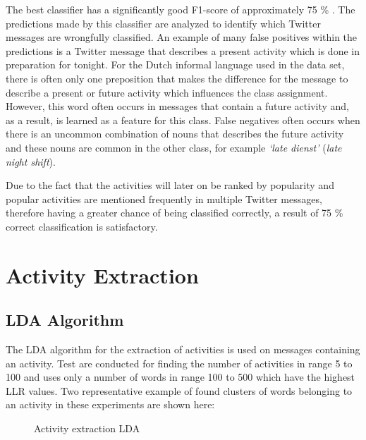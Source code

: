 The best classifier has a significantly good F1-score of approximately 75 \% . The predictions made by this classifier are analyzed to identify which Twitter messages are wrongfully classified. An example of many false positives within the predictions is a Twitter message that describes a present activity which is done in preparation for tonight. For the Dutch informal language used in the data set, there is often only one preposition that makes the difference for the message to describe a present or future activity which influences the class assignment. However, this word often occurs in messages that contain a future activity and, as a result, is learned as a feature for this class. False negatives often occurs when there is an uncommon combination of nouns that describes the future activity and these nouns are common in the other class, for example \textit{`late dienst'} (\textit{late night shift}). 

Due to the fact that the activities will later on be ranked by popularity and popular activities are mentioned frequently in multiple Twitter messages, therefore having a greater chance of being classified correctly, a result of 75 \% correct classification is satisfactory. 


\section{Activity Extraction}\label{sec:res_extraction}

\subsection{LDA Algorithm}
The LDA algorithm for the extraction of activities is used on messages containing an activity. Test are conducted for finding the number of activities in range 5 to 100 and uses only a number of words in range 100 to 500 which have the highest LLR values. Two representative example of found clusters of words belonging to an activity in these experiments are shown here:
~\\
\begin{figure}[H]
  \centering

\begin{framed}
  \theverbbox
\end{framed}

  \caption{Activity extraction LDA}\label{fig:lda}
\end{figure}

